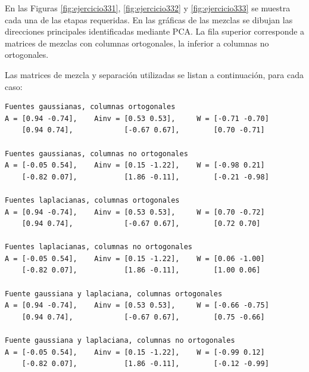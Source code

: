 \documentclass[11pt,a4paper,final]{article}
\begin{document}
En las Figuras \ref{fig:ejercicio331}, \ref{fig:ejercicio332} y \ref{fig:ejercicio333} se muestra cada una de las etapas requeridas. En las gráficas de las mezclas se dibujan las direcciones principales identificadas mediante PCA. La fila superior corresponde a matrices de mezclas con columnas ortogonales, la inferior a columnas no ortogonales.

Las matrices de mezcla y separación utilizadas se listan a continuación, para cada caso:
\begin{verbatim}Fuentes gaussianas, columnas ortogonales
A = [0.94 -0.74],	 Ainv = [0.53 0.53],	 W = [-0.71 -0.70]
    [0.94 0.74],	        [-0.67 0.67],	     [0.70 -0.71]

Fuentes gaussianas, columnas no ortogonales
A = [-0.05 0.54],	 Ainv = [0.15 -1.22],	 W = [-0.98 0.21]
    [-0.82 0.07],	        [1.86 -0.11],	     [-0.21 -0.98]

Fuentes laplacianas, columnas ortogonales
A = [0.94 -0.74],	 Ainv = [0.53 0.53],	 W = [0.70 -0.72]
    [0.94 0.74],	        [-0.67 0.67],	     [0.72 0.70]

Fuentes laplacianas, columnas no ortogonales
A = [-0.05 0.54],	 Ainv = [0.15 -1.22],	 W = [0.06 -1.00]
    [-0.82 0.07],	        [1.86 -0.11],	     [1.00 0.06]

Fuente gaussiana y laplaciana, columnas ortogonales
A = [0.94 -0.74],	 Ainv = [0.53 0.53],	 W = [-0.66 -0.75]
    [0.94 0.74],	        [-0.67 0.67],	     [0.75 -0.66]

Fuente gaussiana y laplaciana, columnas no ortogonales
A = [-0.05 0.54],	 Ainv = [0.15 -1.22],	 W = [-0.99 0.12]
    [-0.82 0.07],	        [1.86 -0.11],	     [-0.12 -0.99]
\end{verbatim}
\end{document}
